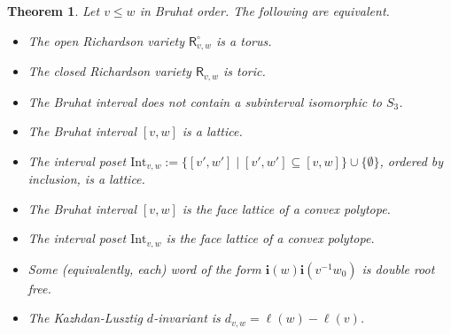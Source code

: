 \documentclass[a4paper, 11pt]{amsart}
\newcommand{\orich}[1]{\mathsf{R}^{\circ}_{#1}}
\newcommand{\rich}[1]{\mathsf{R}_{#1}}
\newcommand{\word}[1]{\mathbf{#1}}
\newtheorem{theorem}{Theorem}[section]
\theoremstyle{definition}
\begin{document}
\begin{theorem}\label{thm:toric-richardson-variety}
Let $v \leq w$ in Bruhat order. The following are equivalent.
\begin{itemize}
    \item[(a)] The open Richardson variety $\orich{v,w}$ is a torus.
    \item[(b)] The closed Richardson variety $\rich{v,w}$ is toric.
    \item[(c)] The Bruhat interval does not contain a subinterval isomorphic to $S_3$.
    \item[(d)] The Bruhat interval $[v,w]$ is a lattice.
    \item[(e)] The interval poset $\mathrm{Int}_{v,w} := \{[v',w'] \mid [v', w'] \subseteq [v,w]\}\cup\{\emptyset\}$, ordered by inclusion, is a lattice.
    \item[(f)] The Bruhat interval $[v,w]$ is the face lattice of a convex polytope.
    \item[(g)] The interval poset $\mathrm{Int}_{v,w}$ is the face lattice of a convex polytope.
    \item[(h)] Some (equivalently, each) word of the form $\word{i}(w)\word{i}(v^{-1}w_0)$ is double root free. 
    \item[(i)] The Kazhdan-Lusztig $d$-invariant is $d_{v,w} = \ell(w) - \ell(v)$.
\end{itemize}
\end{theorem}
\end{document}
